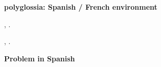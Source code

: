 \documentclass{article}
\newcommand\case[1]{\par\medskip\noindent\textbf{#1}\par\nopagebreak}
\begin{document}
\case{polyglossia: Spanish / French environment}
, .
\begin{french}, .\end{french}

\case{Problem in Spanish}
\end{document}
